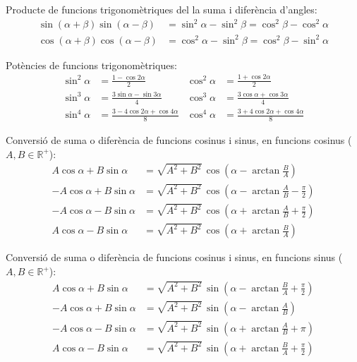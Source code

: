 Producte de funcions trigonom\`{e}triques del la suma i difer\`{e}ncia
d'angles:
\begin{subequations}
\begin{align}
    \sin(\alpha+\beta) \sin(\alpha-\beta) &= \sin^2\alpha-\sin^2\beta =
    \cos^2\beta - \cos^2\alpha\\[1ex]
    \cos(\alpha+\beta) \cos(\alpha-\beta) &= \cos^2\alpha-\sin^2\beta =
    \cos^2\beta - \sin^2\alpha
\end{align}
\end{subequations}

Pot\`{e}ncies de funcions trigonom\`{e}triques:
\begin{subequations}
\begin{align}
    \sin^2\alpha &= \frac{1-\cos 2\alpha}{2} &  \cos^2\alpha &= \frac{1+\cos 2\alpha}{2}\\[1ex]
    \sin^3\alpha &= \frac{3\sin\alpha-\sin 3\alpha}{4} &  \cos^3\alpha &= \frac{3\cos\alpha+\cos 3\alpha}{4}\\[1ex]
    \sin^4\alpha &= \frac{3-4\cos 2\alpha+\cos 4\alpha}{8} &  \cos^4\alpha &= \frac{3+4\cos 2\alpha+\cos 4\alpha}{8}
\end{align}
\end{subequations}

Conversi\'{o} de suma o difer\`{e}ncia de funcions cosinus i sinus, en
funcions cosinus ($A,B\in\mathbb{R}^+$):
\begin{subequations}
\begin{align}
    A \cos \alpha +B \sin \alpha &= \sqrt{A^2+B^2}\, \cos \left(\alpha - \arctan\frac{B}{A}\right)\label{eq:AcosBsin}\\
    -A \cos \alpha +B \sin \alpha &= \sqrt{A^2+B^2}\, \cos \left(\alpha - \arctan\frac{A}{B} - \frac{\pi}{2}\right)\\
    -A \cos \alpha -B \sin \alpha &= \sqrt{A^2+B^2}\, \cos \left(\alpha + \arctan\frac{A}{B} + \frac{\pi}{2}\right)\label{eq:-Acos-Bsin}\\
    A \cos \alpha -B \sin \alpha &= \sqrt{A^2+B^2}\, \cos \left(\alpha + \arctan\frac{B}{A}\right)
\end{align}
\end{subequations}

Conversi\'{o} de suma o difer\`{e}ncia de funcions cosinus i sinus, en
funcions sinus ($A,B\in\mathbb{R}^+$):
\begin{subequations}
\begin{align}
    A \cos \alpha +B \sin \alpha &= \sqrt{A^2+B^2}\, \sin \left(\alpha - \arctan\frac{B}{A} +\frac{\pi}{2}\right)\label{eq:AcosBsin}\\
    -A \cos \alpha +B \sin \alpha &= \sqrt{A^2+B^2}\, \sin \left(\alpha - \arctan\frac{A}{B}\right)\\
    -A \cos \alpha -B \sin \alpha &= \sqrt{A^2+B^2}\, \sin \left(\alpha + \arctan\frac{A}{B} + \pi\right)\label{eq:-Acos-Bsin}\\
    A \cos \alpha -B \sin \alpha &= \sqrt{A^2+B^2}\, \sin \left(\alpha + \arctan\frac{B}{A}+\frac{\pi}{2}\right)
\end{align}
\end{subequations}


